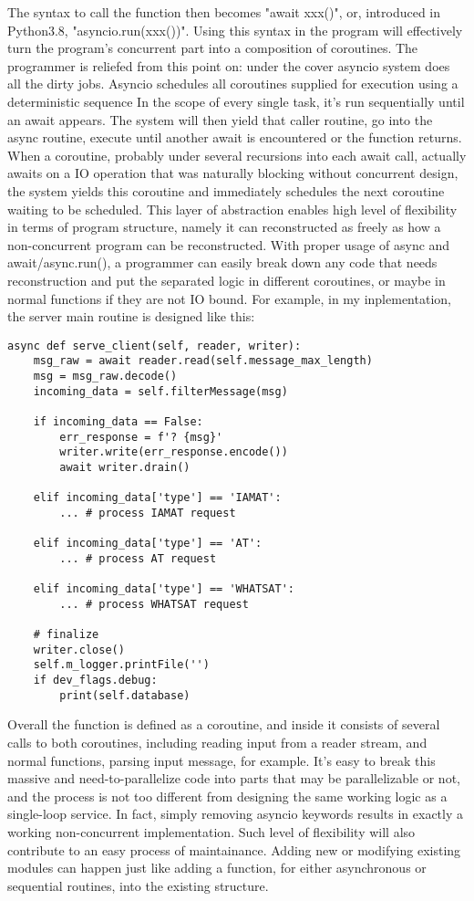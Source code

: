 \documentclass[letterpaper,twocolumn,10pt]{article}
\begin{document}
The syntax to call the function then becomes "await xxx()", or, introduced in Python3.8, "asyncio.run(xxx())". 
Using this syntax in the program will effectively turn the program's concurrent part into a composition of coroutines. 
The programmer is reliefed from this point on: under the cover asyncio system does all the dirty jobs. 
Asyncio schedules all coroutines supplied for execution using a deterministic sequence
In the scope of every single task, it's run sequentially until an await appears. 
The system will then yield that caller routine, go into the async routine, execute until another await is encountered or the function returns. 
When a coroutine, probably under several recursions into each await call, actually awaits on a IO operation that was naturally blocking without concurrent design, the system yields this coroutine and immediately schedules the next coroutine waiting to be scheduled.  
This layer of abstraction enables high level of flexibility in terms of program structure, namely it can reconstructed as freely as how a non-concurrent program can be reconstructed. 
With proper usage of async and await/async.run(), a programmer can easily break down any code that needs reconstruction and put the separated logic in different coroutines, or maybe in normal functions if they are not IO bound.
For example, in my inplementation, the server main routine is designed like this:
\begin{lstlisting}[breaklines=true]
async def serve_client(self, reader, writer):
    msg_raw = await reader.read(self.message_max_length)
    msg = msg_raw.decode()
    incoming_data = self.filterMessage(msg)

    if incoming_data == False:
        err_response = f'? {msg}'
        writer.write(err_response.encode())
        await writer.drain()

    elif incoming_data['type'] == 'IAMAT':
        ... # process IAMAT request

    elif incoming_data['type'] == 'AT':
        ... # process AT request

    elif incoming_data['type'] == 'WHATSAT':
        ... # process WHATSAT request
    
    # finalize
    writer.close()
    self.m_logger.printFile('')
    if dev_flags.debug:
        print(self.database)
\end{lstlisting}
Overall the function is defined as a coroutine, and inside it consists of several calls to both coroutines, including reading input from a reader stream, and normal functions, parsing input message, for example.
It's easy to break this massive and need-to-parallelize code into parts that may be parallelizable or not,
and the process is not too different from designing the same working logic as a single-loop service.
In fact, simply removing asyncio keywords results in exactly a working non-concurrent implementation.
Such level of flexibility will also contribute to an easy process of maintainance. 
Adding new or modifying existing modules can happen just like adding a function, for either asynchronous or sequential routines, into the existing structure.
\end{document}
